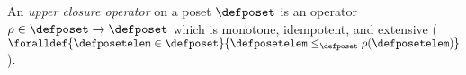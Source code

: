 An \emph{upper closure operator} on a poset $\defposet$ is an operator $\rho\in\defposet\to\defposet$ which is monotone, idempotent, and extensive ($\foralldef{\defposetelem \in \defposet}{\defposetelem \le_\defposet \rho(\defposetelem)}$).

